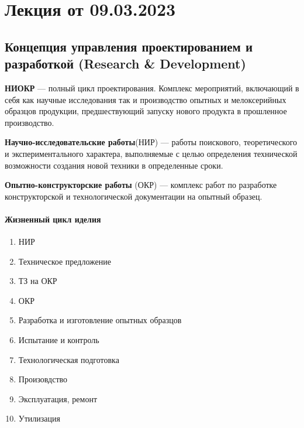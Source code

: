 
\section{Лекция от 09.03.2023}
\subsection{Концепция управления проектированием и разработкой (Research \&
  Development)}

\textbf{НИОКР} --- полный цикл проектирования. Комплекс мероприятий, включающий
в себя как научные исследования так и производство опытных и мелоксерийных
образцов продукции, предшествующий запуску нового продукта в прошленное
производство.

\textbf{Научно-исследовательские работы}(НИР) --- работы поискового,
теоретического и экспериментального характера, выполняемые с целью определения
технической возможности создания новой техники в определенные сроки.

\begin{figure}[h]
  \centering
\end{figure}

\textbf{Опытно-конструкторские работы} (ОКР) --- комплекс работ по разработке
конструкторской и технологической документации на опытный образец.

\paragraph{Жизненный цикл иделия}\mbox{}\par
\begin{enumerate}
  \item НИР
  \item Техническое предложение
  \item ТЗ на ОКР
  \item ОКР
  \item Разработка и изготовление опытных образцов
  \item Испытание и контроль
  \item Технологическая подготовка
  \item Произовдство
  \item Эксплуатация, ремонт
  \item Утилизация
\end{enumerate}

